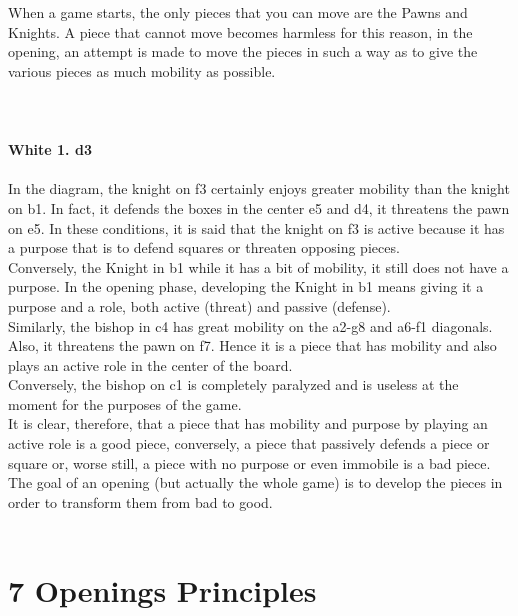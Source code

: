 \documentclass{article}
\begin{document}
When a game starts, the only pieces that you can move are the Pawns and Knights. A piece that cannot move becomes harmless for this reason, in the opening, an attempt is made to move the pieces in such a way as to give the various pieces as much mobility as possible.\\
\\

\\
\\
\textbf{White 1. d3}\\
\\
In the diagram, the knight on f3 certainly enjoys greater mobility than the knight on b1. In fact, it defends the boxes in the center e5 and d4, it threatens the pawn on e5. In these conditions, it is said that the knight on f3 is active because it has a purpose that is to defend squares or threaten opposing pieces.\\Conversely, the Knight in b1 while it has a bit of mobility, it still does not have a purpose. In the opening phase, developing the Knight in b1 means giving it a purpose and a role, both active (threat) and passive (defense).\\Similarly, the bishop in c4 has great mobility on the a2-g8 and a6-f1 diagonals. Also, it threatens the pawn on f7. Hence it is a piece that has mobility and also plays an active role in the center of the board.\\Conversely, the bishop on c1 is completely paralyzed and is useless at the moment for the purposes of the game.\\It is clear, therefore, that a piece that has mobility and purpose by playing an active role is a good piece, conversely, a piece that passively defends a piece or square or, worse still, a piece with no purpose or even immobile is a bad piece. The goal of an opening (but actually the whole game) is to develop the pieces in order to transform them from bad to good.\\
\\
\section{ 7 Openings Principles}
\end{document}
